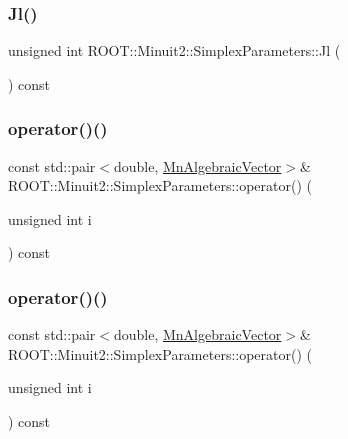 \subsubsection{\texorpdfstring{Jl()}{Jl()}\hspace{0.1cm}{\footnotesize\ttfamily [3/3]}}
{\footnotesize\ttfamily unsigned int R\+O\+O\+T\+::\+Minuit2\+::\+Simplex\+Parameters\+::\+Jl (\begin{DoxyParamCaption}{ }\end{DoxyParamCaption}) const\hspace{0.3cm}{\ttfamily [inline]}}

\mbox{\label{classROOT_1_1Minuit2_1_1SimplexParameters_aa05f3fb5da27277879fad702d85bae49}} 
\subsubsection{\texorpdfstring{operator()()}{operator()()}\hspace{0.1cm}{\footnotesize\ttfamily [1/3]}}
{\footnotesize\ttfamily const std\+::pair$<$double, \mbox{\hyperlink{namespaceROOT_1_1Minuit2_a62ed97730a1ca8d3fbaec64a19aa11c9}{Mn\+Algebraic\+Vector}}$>$\& R\+O\+O\+T\+::\+Minuit2\+::\+Simplex\+Parameters\+::operator() (\begin{DoxyParamCaption}\item[{unsigned int}]{i }\end{DoxyParamCaption}) const\hspace{0.3cm}{\ttfamily [inline]}}

\mbox{\label{classROOT_1_1Minuit2_1_1SimplexParameters_aa05f3fb5da27277879fad702d85bae49}} 
\subsubsection{\texorpdfstring{operator()()}{operator()()}\hspace{0.1cm}{\footnotesize\ttfamily [2/3]}}
{\footnotesize\ttfamily const std\+::pair$<$double, \mbox{\hyperlink{namespaceROOT_1_1Minuit2_a62ed97730a1ca8d3fbaec64a19aa11c9}{Mn\+Algebraic\+Vector}}$>$\& R\+O\+O\+T\+::\+Minuit2\+::\+Simplex\+Parameters\+::operator() (\begin{DoxyParamCaption}\item[{unsigned int}]{i }\end{DoxyParamCaption}) const\hspace{0.3cm}{\ttfamily [inline]}}

